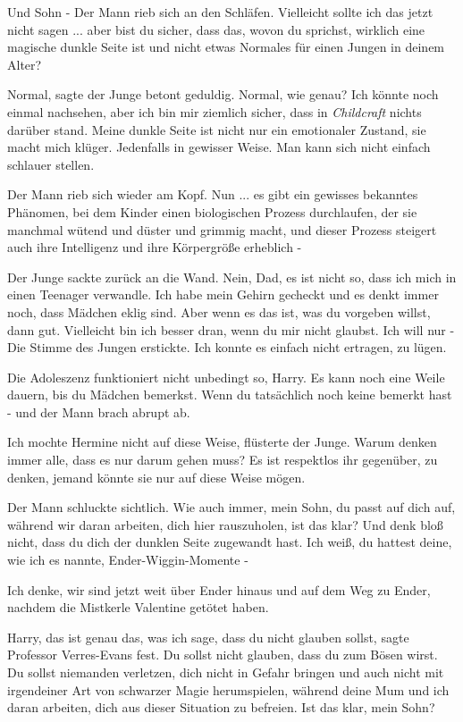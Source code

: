 \glqq{}Und Sohn -\grqq{} Der Mann rieb sich an den Schläfen. \glqq{}Vielleicht
sollte ich das jetzt nicht sagen ... aber bist du sicher, dass das, wovon du
sprichst, wirklich eine magische dunkle Seite ist und nicht etwas Normales für
einen Jungen in deinem Alter?\grqq{}

\glqq{}Normal\grqq{}, sagte der Junge betont geduldig. \glqq{}Normal, wie genau?
Ich könnte noch einmal nachsehen, aber ich bin mir ziemlich sicher, dass in
\emph{Childcraft} nichts darüber stand. Meine dunkle Seite ist nicht nur ein
emotionaler Zustand, sie macht mich klüger. Jedenfalls in gewisser Weise. Man
kann sich nicht einfach schlauer stellen.\grqq{}

Der Mann rieb sich wieder am Kopf. \glqq{}Nun ... es gibt ein gewisses bekanntes
Phänomen, bei dem Kinder einen biologischen Prozess durchlaufen, der sie
manchmal wütend und düster und grimmig macht, und dieser Prozess steigert auch
ihre Intelligenz und ihre Körpergröße erheblich -\grqq{}

Der Junge sackte zurück an die Wand. \glqq{}Nein, Dad, es ist nicht so, dass ich
mich in einen Teenager verwandle. Ich habe mein Gehirn gecheckt und es denkt
immer noch, dass Mädchen eklig sind. Aber wenn es das ist, was du vorgeben
willst, dann gut. Vielleicht bin ich besser dran, wenn du mir nicht glaubst. Ich
will nur -\grqq{} Die Stimme des Jungen erstickte. \glqq{}Ich konnte es einfach
nicht ertragen, zu lügen.\grqq{}

\glqq{}Die Adoleszenz funktioniert nicht unbedingt so, Harry. Es kann noch eine
Weile dauern, bis du Mädchen bemerkst. Wenn du tatsächlich noch keine bemerkt
hast -\grqq{} und der Mann brach abrupt ab.

\glqq{}Ich mochte Hermine nicht auf diese Weise\grqq{}, flüsterte der Junge.
\glqq{}Warum denken immer alle, dass es nur darum gehen muss? Es ist respektlos
ihr gegenüber, zu denken, jemand könnte sie nur auf diese Weise mögen.\grqq{}

Der Mann schluckte sichtlich. \glqq{}Wie auch immer, mein Sohn, du passt auf dich
auf, während wir daran arbeiten, dich hier rauszuholen, ist das klar? Und denk
bloß nicht, dass du dich der dunklen Seite zugewandt hast. Ich weiß, du hattest
deine, wie ich es nannte, Ender-Wiggin-Momente -\grqq{}

\glqq{}Ich denke, wir sind jetzt weit über Ender hinaus und auf dem Weg zu Ender,
nachdem die Mistkerle Valentine getötet haben.\grqq{}

\glqq{}Harry, das ist genau das, was ich sage, dass du nicht glauben
sollst\grqq{}, sagte Professor Verres-Evans fest. \glqq{}Du sollst nicht glauben,
dass du zum Bösen wirst. Du sollst niemanden verletzen, dich nicht in Gefahr
bringen und auch nicht mit irgendeiner Art von schwarzer Magie herumspielen,
während deine Mum und ich daran arbeiten, dich aus dieser Situation zu befreien.
Ist das klar, mein Sohn?\grqq{}

